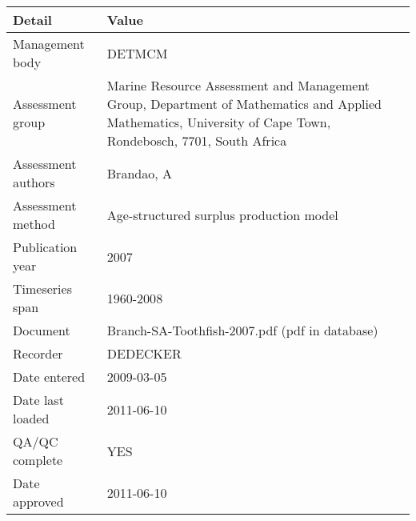 \begin{table}[htb]
\centering
\begin{tabular}{lp{7cm}}
\toprule
Detail & Value \\
\midrule
Management body    & DETMCM                                                                                                                                                      \\
Assessment group   & Marine Resource Assessment and Management Group, Department of Mathematics and Applied Mathematics, University of Cape Town, Rondebosch, 7701, South Africa \\
Assessment authors & Brandao, A                                                                                                                                                  \\
Assessment method  & Age-structured surplus production model                                                                                                                     \\
Publication year   & 2007                                                                                                                                                        \\
Timeseries span    & 1960-2008                                                                                                                                                   \\
Document           & Branch-SA-Toothfish-2007.pdf (pdf in database)                                                                                                              \\
Recorder           & DEDECKER                                                                                                                                                    \\
Date entered       & 2009-03-05                                                                                                                                                  \\
Date last loaded   & 2011-06-10                                                                                                                                                  \\
QA/QC complete     & YES                                                                                                                                                         \\
Date approved      & 2011-06-10                                                                                                                                                  \\
\bottomrule
\end{tabular}
\label{tab:assessdet}
\end{table}
